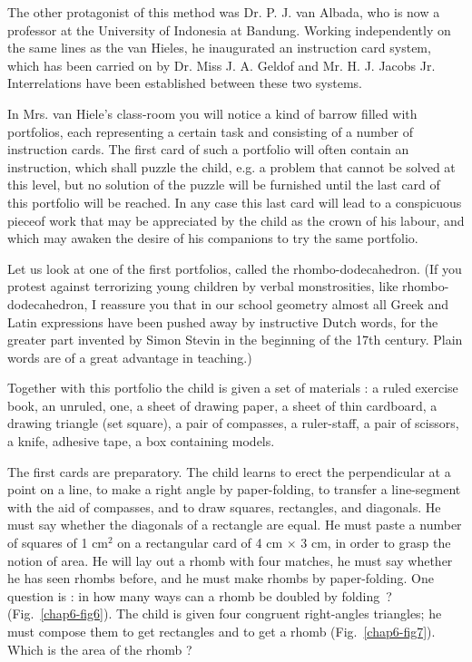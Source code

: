 The other protagonist of this method was Dr. P. J. van Albada, who is now a professor at the University of Indonesia at Bandung. Working independently on the same lines as the van Hieles, he inaugurated an instruction card system, which has been carried on by Dr. Miss J. A. Geldof and Mr. H. J. Jacobs Jr. Interrelations have been established between these two systems.

In Mrs. van Hiele's class-room you will notice a kind of barrow filled with portfolios, each representing a certain task and consisting of a number of instruction cards. The first card of such a portfolio will often contain an instruction, which shall puzzle the child, e.g. a problem that cannot be solved at this level, but no solution of the puzzle will be furnished until the last card of this portfolio will be reached. In any case this last card will lead to a conspicuous piece\pageoriginale of work that may be appreciated by the child as the crown of his labour, and which may awaken the desire of his companions to try the same portfolio.

Let us look at one of the first portfolios, called the rhombo-dodeca\-hedron. (If you protest against terrorizing young children by verbal monstrosities, like rhombo-dodecahedron, I reassure you that in our school geometry almost all Greek and Latin expressions have been push\-ed away by instructive Dutch words, for the greater part invented by Simon Stevin in the beginning of the 17th century. Plain words are of a great advantage in teaching.)

Together with this portfolio the child is given a set of materials : a ruled exercise book, an unruled, one, a sheet of drawing paper, a sheet of thin cardboard, a drawing triangle (set square), a pair of compasses, a ruler-staff, a pair of scissors, a knife, adhesive tape, a box containing models.

The first cards are preparatory. The child learns to erect the perpendicular at a point on a line, to make a right angle by paper-folding, to transfer a line-segment with the aid of compasses, and to draw squares, rectangles, and diagonals. He must say whether the diagonals of a rectangle are equal. He must paste a number of squares of 1 cm$^{2}$ on a rectangular card of 4 cm $\times$ 3 cm, in order to grasp the notion of area. He will lay out a rhomb with four matches, he must say whether he has seen rhombs before, and he must make rhombs by paper-folding. One question is : in how many ways can a rhomb be doubled by folding~? (Fig.~\ref{chap6-fig6}). The child is given four congruent right-angles triangles; he must compose them to get rectangles and to get a rhomb (Fig.~\ref{chap6-fig7}). Which is the area of the rhomb ?

